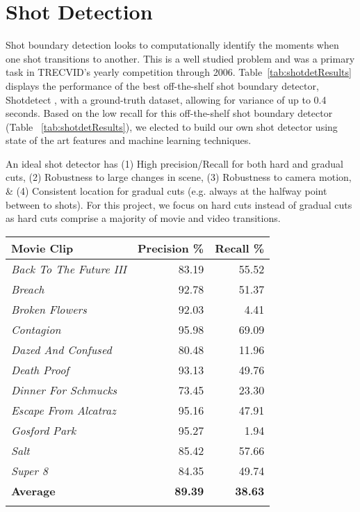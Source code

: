 \section*{Shot Detection}

Shot boundary detection looks to computationally identify the moments when one shot transitions to another. This is a well studied problem \cite{boreczky1996comparison, lienhart1998comparison, lu2013fast,chavan2014review} and was a primary task in TRECVID's yearly competition \cite{smeaton_video_2010} through 2006. Table~\ref{tab:shotdetResults} displays the performance of the best off-the-shelf shot boundary detector, Shotdetect \cite{mathe_shotdetect_2015}, with a ground-truth dataset, allowing for variance of up to 0.4 seconds. Based on the low recall for this off-the-shelf shot boundary detector (Table ~\ref{tab:shotdetResults}), we elected to build our own shot detector using state of the art features and machine learning techniques.

An ideal shot detector has (1) High precision/Recall for both hard and gradual cuts, (2) Robustness to large changes in scene, (3) Robustness to camera motion, \& (4) Consistent location for gradual cuts (e.g. always at the halfway point between to shots). For this project, we focus on hard cuts instead of gradual cuts as hard cuts comprise a majority of movie and video transitions.

\begin{center}
  \small{
  \begin{tabular}{ l | r r }
    Movie Clip & Precision \% & Recall \% \\
    \hline
    \textit{ Back To The Future III } &  83.19 &  55.52\\
    \textit{ Breach } &  92.78 &  51.37\\
    \textit{ Broken Flowers } &  92.03 &  4.41\\
    \textit{ Contagion } &  95.98 &  69.09\\
    \textit{ Dazed And Confused } &  80.48 &  11.96\\
    \textit{ Death Proof } &  93.13 &  49.76\\
    \textit{ Dinner For Schmucks } &  73.45 &  23.30\\
    \textit{ Escape From Alcatraz } &  95.16 &  47.91\\
    \textit{ Gosford Park } &  95.27 &  1.94\\
    \textit{ Salt } &  85.42 &  57.66\\
    \textit{ Super 8 } &  84.35 &  49.74\\
    \textbf{ Average } &  \textbf{89.39} &  \textbf{38.63}\\
    \label{tab:shotdetResults}
  \end{tabular}}
\end{center}

